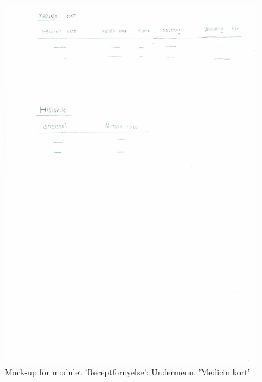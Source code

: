  \begin{figure}[H]
	\centering
	\includegraphics[angle=0, height=0.2\textheight]{Materials/FornyRecept_Medicinkort.pdf}
	\caption{Mock-up for modulet 'Receptfornyelse': Undermenu, 'Medicin kort'}
	\label{fig:Mock-Up}
\end{figure}
